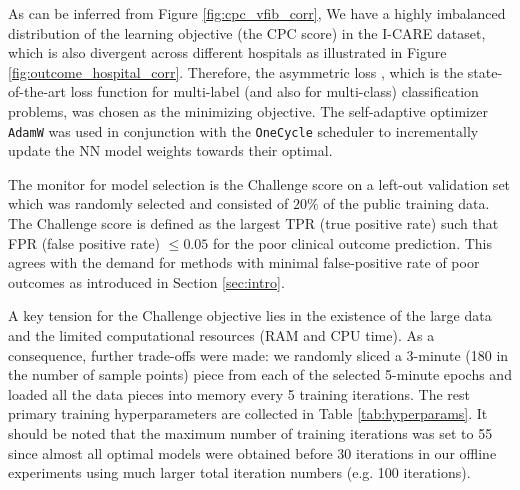 As can be inferred from Figure \ref{fig:cpc_vfib_corr}, We have a highly imbalanced distribution of the learning objective (the CPC score) in the I-CARE dataset, which is also divergent across different hospitals as illustrated in Figure \ref{fig:outcome_hospital_corr}. Therefore, the asymmetric loss \cite{ridnik2021asymmetric_loss}, which is the state-of-the-art loss function for multi-label (and also for multi-class) classification problems, was chosen as the minimizing objective. The self-adaptive optimizer \texttt{AdamW} was used in conjunction with the \texttt{OneCycle} scheduler to incrementally update the NN model weights towards their optimal.



The monitor for model selection is the Challenge score on a left-out validation set which was randomly selected and consisted of $20\%$ of the public training data. The Challenge score is defined as the largest TPR (true positive rate) such that FPR (false positive rate) $\le 0.05$ for the poor clinical outcome prediction. This agrees with the demand for methods with minimal false-positive rate of poor outcomes as introduced in Section \ref{sec:intro}.

A key tension for the Challenge objective lies in the existence of the large data and the limited computational resources (RAM and CPU time). As a consequence, further trade-offs were made: we randomly sliced a 3-minute (180 in the number of sample points) piece from each of the selected 5-minute epochs and loaded all the data pieces into memory every 5 training iterations. The rest primary training hyperparameters are collected in Table \ref{tab:hyperparams}. It should be noted that the maximum number of training iterations was set to 55 since almost all optimal models were obtained before 30 iterations in our offline experiments using much larger total iteration numbers (e.g. 100 iterations).





